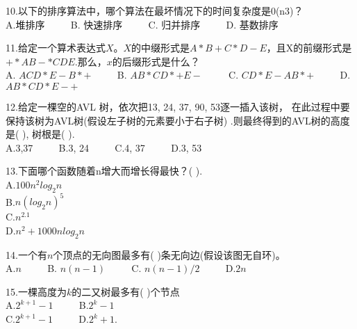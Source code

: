 10.以下的排序算法中，哪个算法在最坏情况下的时间复杂度是0(n3)？ \\
A.堆排序  $\qquad$ B. 快速排序  $\qquad$ C. 归并排序 $\qquad$ D. 基数排序

11.给定一个算术表达式$X$。$X$的中缀形式是$A*B+C*D-E$，且X的前缀形式是$+*AB-*CDE$.那么，$x$的后缀形式是什么？ \\
A. $ACD*E-B*+$ $\qquad$ B. $AB*CD*+E-$ $\qquad$ C. $CD*E-AB*+$ $\qquad$ D. $AB*CD*E-+$

12.给定一棵空的AVL 树，依次把13, 24, 37, 90, 53逐一插入该树， 在此过程中要保持该树为AVL树(假设左子树的元素要小于右子树) .则最终得到的AVL树的高度是( ), 树根是( ). \\
A.3,37 $\qquad$ B.3, 24 $\qquad$ C.4, 37 $\qquad$ D.3, 53

13.下面哪个函数随着n增大而增长得最快？( ). \\
A.$100n^2log_2n$ \\
B.$n(log_2n)^5$ \\
C.$n^{2.1}$ \\
D.$n^2+1000nlog_2n$

14.一个有$n$个顶点的无向图最多有( )条无向边(假设该图无自环)。 \\
A.$n$ $\qquad$ B. $n(n-1)$ $\qquad$ C. $n(n-1)/2$ $\qquad$ D.$2n$

15.一棵高度为$k$的二又树最多有( )个节点 \\
A.$2^{k+1}-1$ $\qquad$ B.$2^k-1$ \\
C.$2^{k+1}-1$ $\qquad$ D.$2^k+1$.